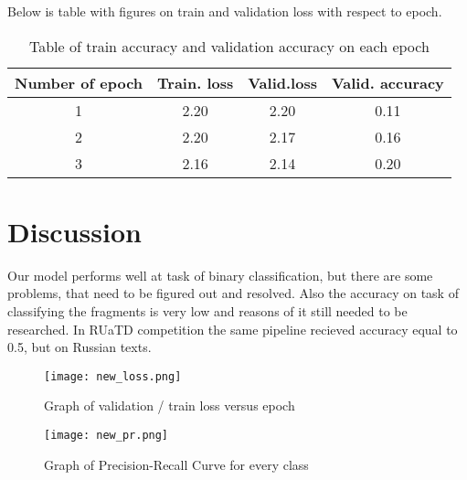 \documentclass{article}
\begin{document}
Below is table with figures on train and validation loss with respect to epoch.
\begin{table}[bhtp]
	\centering
	\caption{Table of train accuracy and validation accuracy on each epoch}
	\label{tbl:space_and_subspace}
	\begin{tabular}{| c | c | c | c | }
		\hline
		Number of epoch & Train. loss & Valid.loss & Valid. accuracy \\
		\hline
		1 & 2.20  & 2.20 & 0.11  \\
        \hline
		2 & 2.20 & 2.17 & 0.16  \\
		\hline
        3 & 2.16  & 2.14 & 0.20 \\
        \hline
	\end{tabular}
\end{table}

\section{Discussion}

Our model performs well at task of binary classification, but there are some problems, that need to be figured out and resolved. Also the accuracy on task of classifying the fragments is very low and reasons of it still needed to be researched. In RUaTD competition the same pipeline recieved accuracy equal to 0.5, but on Russian texts.


\begin{figure}[bhtp]
	\texttt{[image: new\_loss.png]}
	\caption{Graph of validation / train loss versus epoch}
	\label{fig:1}
\end{figure}


\begin{figure}[bhtp]
	\texttt{[image: new\_pr.png]}
	\caption{Graph of Precision-Recall Curve for every class}
	\label{fig:2}
\end{figure}
\end{document}
